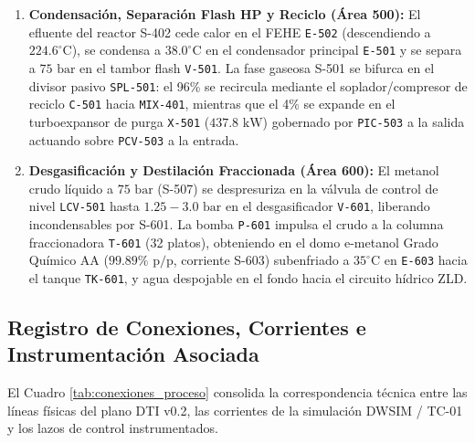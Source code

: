 \documentclass[10pt,letterpaper]{article}
\begin{document}
\begin{enumerate}[leftmargin=*]
    \item \textbf{Condensación, Separación Flash HP y Reciclo (Área 500):} El efluente del reactor S-402 cede calor en el FEHE \texttt{E-502} (descendiendo a $224.6^\circ\text{C}$), se condensa a $38.0^\circ\text{C}$ en el condensador principal \texttt{E-501} y se separa a $75\text{ bar}$ en el tambor flash \texttt{V-501}. La fase gaseosa S-501 se bifurca en el divisor pasivo \texttt{SPL-501}: el 96\% se recircula mediante el soplador/compresor de reciclo \texttt{C-501} hacia \texttt{MIX-401}, mientras que el 4\% se expande en el turboexpansor de purga \texttt{X-501} ($437.8\text{ kW}$) gobernado por \texttt{PIC-503} a la salida actuando sobre \texttt{PCV-503} a la entrada.
    \item \textbf{Desgasificación y Destilación Fraccionada (Área 600):} El metanol crudo líquido a $75\text{ bar}$ (S-507) se despresuriza en la válvula de control de nivel \texttt{LCV-501} hasta $1.25-3.0\text{ bar}$ en el desgasificador \texttt{V-601}, liberando incondensables por S-601. La bomba \texttt{P-601} impulsa el crudo a la columna fraccionadora \texttt{T-601} (32 platos), obteniendo en el domo e-metanol Grado Químico AA ($99.89\%\text{ p/p}$, corriente S-603) subenfriado a $35^\circ\text{C}$ en \texttt{E-603} hacia el tanque \texttt{TK-601}, y agua despojable en el fondo hacia el circuito hídrico ZLD.
\end{enumerate}

\subsection{Registro de Conexiones, Corrientes e Instrumentación Asociada}
El Cuadro \ref{tab:conexiones_proceso} consolida la correspondencia técnica entre las líneas físicas del plano DTI v0.2, las corrientes de la simulación DWSIM / TC-01 y los lazos de control instrumentados.
\end{document}

